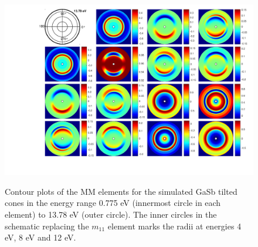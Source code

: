 \begin{figure}
    \centering
    \includegraphics[width=\linewidth, trim=3.9cm 2.1cm 0.4cm 0cm, clip]{figures/ch4/gasb/contour/GaSbCones_contour_MM_13point78eV.pdf}
    \label{fig:gasb_contour_MM_full}
    \caption{Contour plots of the MM elements for the simulated GaSb tilted cones in the energy range 0.775 eV (innermost circle in each element) to 13.78 eV (outer circle). The inner circles in the schematic replacing the $m_{11}$ element marks the radii at energies 4 eV, 8 eV and 12 eV.}
\end{figure}
